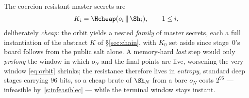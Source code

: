 The coercion-resistant master secrets are
\begin{equation}
  K_i = \Hcheap(o_i \,\|\, \Sh_i), \qquad 1 \le i,
  \label{eq:master}
\end{equation}
deliberately \emph{cheap}: the orbit yields a nested \emph{family} of master
secrets, each a full instantiation of the abstract $K$ of \S\ref{sec:chain}, with
$K_0$ set aside since stage~$0$'s board follows from the public salt alone. A
memory-hard \emph{last} step would only \emph{prolong} the window in which $o_N$
and the final points are live, worsening the very window \eqref{eq:orbit} shrinks;
the resistance therefore lives in \emph{entropy}, standard deep stages carrying 96
bits, so a cheap brute of $\Sh_N$ from a bare $o_N$ costs $2^{96}$ --- infeasible
by~\ref{s:infeasiblec} --- while the terminal window stays instant.


